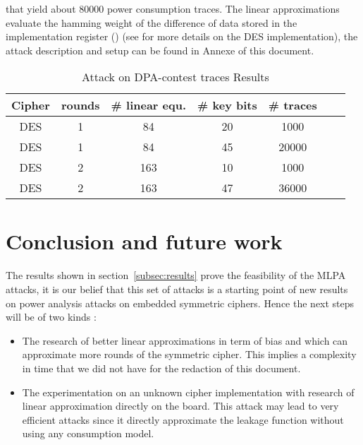 \documentclass[11pt,a4paper]{article}
\begin{document}
{{{{{{{{{{{that yield about 80000 power consumption traces. The linear approximations evaluate the hamming weight of the difference of data stored in the implementation register ()
(see \cite{guilleyHoogvorstPascalet07} for more details on the DES implementation), the attack description and setup can be found in Annexe of this document.
\begin{table}[!h]
\begin{center}
\footnotesize{
\begin{tabular}{|c|c|c|c|c|c|c|}
\hline
Cipher & rounds & \# linear equ. & \# key bits & \# traces \\
\hline
\hline
DES    & 1      & 84            &  20   &   1000    \\
DES    & 1      & 84            &    45       &   20000   \\
\hline
DES    & 2      & 163           &  10   &   1000    \\
DES    & 2      & 163           &    47       &   36000   \\
\hline
\end{tabular}
\caption{Attack on DPA-contest traces Results}
\label{table:result_MLPA_contest}
}
\end{center}
\end{table}
\section{Conclusion and future work}
\paragraph{}
The results shown in section~\ref{subsec:results} prove the feasibility of the MLPA attacks, it is our belief that this set of attacks is a starting point of 
new results on power analysis attacks on embedded symmetric ciphers. Hence the next steps will be of two kinds :
\begin{itemize}
\item The research of better linear approximations in term of bias and which can approximate more rounds of the symmetric cipher. This implies a
complexity in time that we did not have for the redaction of this document. 
\item The experimentation on an unknown cipher implementation with research of linear approximation directly on the board. This attack may lead
to very efficient attacks since it directly approximate the leakage function without using any consumption model. 
\end{itemize}

}}}}}}}}}}}
\end{document}
